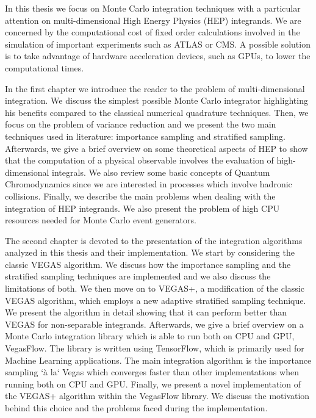 \documentclass[12pt]{article}
\begin{document}
In this thesis we focus on Monte Carlo integration techniques with a particular attention on multi-dimensional High Energy Physics (HEP) integrands.
We are concerned by the computational cost of fixed order calculations involved in the simulation of important experiments such as ATLAS or CMS. A possible solution is to take advantage of hardware acceleration devices, such as GPUs, to lower the computational times.


In the first chapter we introduce the reader to the problem of multi-dimensional integration. We discuss the simplest possible Monte Carlo integrator highlighting his benefits compared to the classical numerical quadrature techniques. Then, we focus on the problem of variance reduction and we present the two main techniques used in literature: importance sampling and stratified sampling.
Afterwards, we give a brief overview on some theoretical aspects of HEP to show that the computation of a physical observable involves the evaluation of high-dimensional integrals. We also review some basic concepts of Quantum Chromodynamics since we are interested in processes which involve hadronic collisions.
Finally, we describe the main problems when dealing with the integration of HEP integrands. We also present the problem of high CPU resources needed for Monte Carlo event generators.


The second chapter is devoted to the presentation of the integration algorithms analyzed in this thesis and their implementation.
We start by considering the classic VEGAS algorithm. We discuss how the importance sampling and the stratified sampling techniques are implemented and we also discuss the limitations of both. We then move on to VEGAS+, a modification of the classic VEGAS algorithm, which employs a new adaptive stratified sampling technique. We present the algorithm in detail showing that it can perform better than VEGAS for non-separable integrands.
Afterwards, we give a brief overview on a Monte Carlo integration library which is able to run both on CPU and GPU, VegasFlow. The library is written using TensorFlow, which is primarily used for
Machine Learning applications. The main integration algorithm is the importance sampling `à la` Vegas which converges faster than other implementations when running both on CPU and GPU.
Finally, we present a novel implementation of the VEGAS+ algorithm within the VegasFlow library. We discuss the motivation behind this choice and the problems faced during the implementation.
\end{document}
